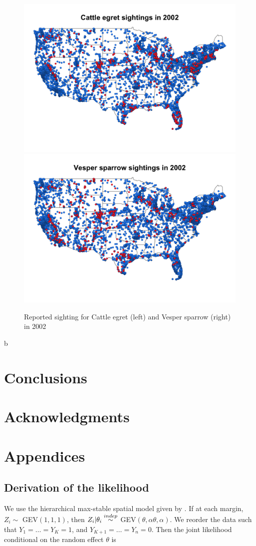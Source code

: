 \begin{figure}
  \centering
  \includegraphics[width=0.47\linewidth]{plots/cattle_egret.png}
  \includegraphics[width=0.47\linewidth]{plots/vesper_sparrow.png}
  \caption{Reported sighting for Cattle egret (left) and Vesper sparrow (right) in 2002}
  \label{fig:data2002}
\end{figure}b

\section{Conclusions}\label{s:con}

\section*{Acknowledgments}

\appendix
\section{Appendices}

\subsection{Derivation of the likelihood} \label{a:likelihoodderivation}
We use the hierarchical max-stable spatial model given by \citet{Reich2012}. If at each margin, $Z_i \sim $ GEV$(1,1,1)$, then $Z_i | \theta_i \stackrel{indep}{\sim} $ GEV$(\theta, \alpha \theta, \alpha)$. We reorder the data such that $Y_1=\ldots=Y_K=1$, and $Y_{K+1} = \ldots = Y_n = 0$. Then the joint likelihood conditional on the random effect $\theta$ is

